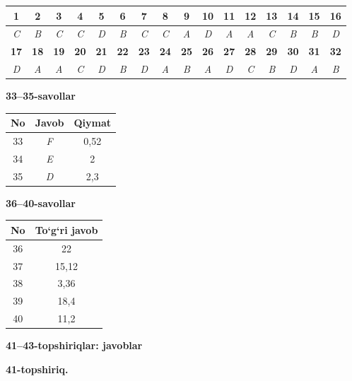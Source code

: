 \documentclass[11pt,a4paper]{article}
\begin{document}
\noindent\begin{tabular}{|c|c|c|c|c|c|c|c|c|c|c|c|c|c|c|c|}\hline
\textbf{1} & \textbf{2} & \textbf{3} & \textbf{4} & \textbf{5} & \textbf{6} & \textbf{7} & \textbf{8} & \textbf{9} & \textbf{10} & \textbf{11} & \textbf{12} & \textbf{13} & \textbf{14} & \textbf{15} & \textbf{16}\\\hline
\textsl{C} & \textsl{B} & \textsl{C} & \textsl{C} & \textsl{D} & \textsl{B} & \textsl{C} & \textsl{C} & \textsl{A} & \textsl{D} & \textsl{A} & \textsl{A} & \textsl{C} & \textsl{B} & \textsl{B} & \textsl{D}\\\hline
\textbf{17} & \textbf{18} & \textbf{19} & \textbf{20} & \textbf{21} & \textbf{22} & \textbf{23} & \textbf{24} & \textbf{25} & \textbf{26} & \textbf{27} & \textbf{28} & \textbf{29} & \textbf{30} & \textbf{31} & \textbf{32}\\\hline
\textsl{D} & \textsl{A} & \textsl{A} & \textsl{C} & \textsl{D} & \textsl{B} & \textsl{D} & \textsl{A} & \textsl{B} & \textsl{A} & \textsl{D} & \textsl{C} & \textsl{B} & \textsl{D} & \textsl{A} & \textsl{B}\\\hline
\end{tabular}\par\medskip
\noindent\textbf{33--35-savollar}\par\smallskip
\noindent\begin{tabular}{|c|c|c|}\hline \textbf{No} & \textbf{Javob} & \textbf{Qiymat}\\\hline
33 & \textsl{F} & 0,52\\\hline
34 & \textsl{E} & 2\\\hline
35 & \textsl{D} & 2,3\\\hline
\end{tabular}\par\medskip
\noindent\textbf{36--40-savollar}\par\smallskip
\noindent\begin{tabular}{|c|c|}\hline \textbf{No} & \textbf{To`g`ri javob}\\\hline
36 & 22\\\hline
37 & 15,12\\\hline
38 & 3,36\\\hline
39 & 18,4\\\hline
40 & 11,2\\\hline
\end{tabular}\par\medskip
\noindent\textbf{41--43-topshiriqlar: javoblar}\par\smallskip
\noindent\textbf{41-topshiriq.}\par
\end{document}
